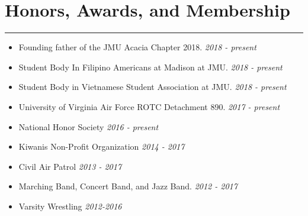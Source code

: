 \documentclass[a4paper]{article}
\begin{document}
\section*{Honors, Awards, and Membership}
\hrule
\vspace{3mm}
\begin{itemize}
	\setlength\itemsep{-0.7mm}
	\item Founding father of the JMU Acacia Chapter 2018.
	\hfill \textit{2018 - present}
	\item Student Body In Filipino Americans at Madison at JMU.
	\hfill \textit{2018 - present}
	\item Student Body in Vietnamese Student Association at JMU.
	\hfill \textit{2018 - present}
	\item University of Virginia Air Force ROTC Detachment 890.
	\hfill \textit{2017 - present}
	\item National Honor Society
	\hfill \textit{2016 - present}
	\item Kiwanis Non-Profit Organization
	\hfill \textit{2014 - 2017}
	\item Civil Air Patrol
	\hfill \textit{2013 - 2017}
	\item Marching Band, Concert Band, and Jazz Band.
	\hfill \textit{2012 - 2017}
	\item Varsity Wrestling
	\hfill \textit{2012-2016}
\end{itemize}
\end{document}
